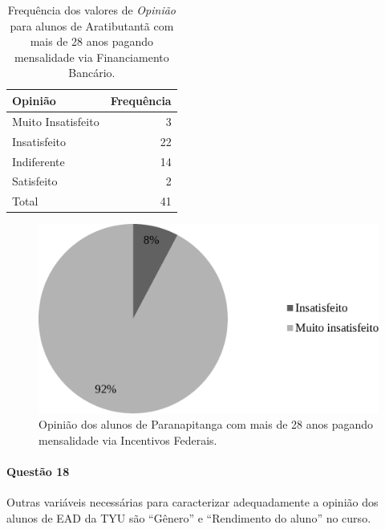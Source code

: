 \documentclass[10pt,a4paper,oneside]{article}
\newcommand{\arat}{Aratibutantã\xspace}
\newcommand{\para}{Paranapitanga\xspace}
\begin{document}
\begin{table}[!h]
	\small
	\centering
	\caption{Frequência dos valores de \textit{Opinião} para alunos de \arat com mais de 28 anos pagando mensalidade via Financiamento Bancário.}
	\label{table:opiniao-28anos-incFederais}
	\begin{tabular}{l r}
		\toprule
		\textbf{Opinião}    & \textbf{Frequência} \\
		\midrule
		Muito Insatisfeito  &  3  \\
		Insatisfeito        &  22 \\
		Indiferente         &  14 \\
		Satisfeito          &  2  \\
		\midrule
		Total               &  41 \\
		\bottomrule
	\end{tabular}
\end{table}

\begin{figure}[!h]
	\centering
	\includegraphics[width=.7\linewidth]{plots/q17c.pdf}
	\caption{Opinião dos alunos de \para com mais de 28 anos pagando mensalidade via Incentivos Federais.}
	\label{fig:opiniao-28anos-incFederaiso}
\end{figure}

\FloatBarrier
\paragraph{Questão 18}
Outras variáveis necessárias para caracterizar adequadamente a opinião dos alunos de EAD da TYU são  ``Gênero'' e ``Rendimento do aluno'' no curso.
\end{document}
